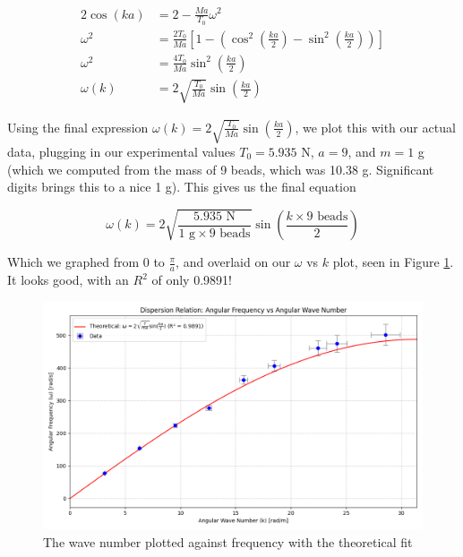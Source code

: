\documentclass[12pt,letterpaper]{article}
\begin{document}
\begin{align}
\label{eqn:dispersiontheo}
    2 \cos (ka) &= 2- \frac{Ma}{T_0}\omega^2 \\
    \omega^2 &= \frac{2T_0}{Ma}\left[1-\left(\cos^2 \left(\frac{ka}{2}\right)-\sin^2 \left(\frac{ka}{2}\right)\right)\right] \\
    \omega^2 &= \frac{4T_0}{Ma} \sin^2 \left(\frac{ka}{2}\right) \\
    \omega(k) &= 2\sqrt{\frac{T_0}{Ma}}\sin\left(\frac{ka}{2}\right)
\end{align}


Using the final expression $\omega(k) = 2\sqrt{\frac{T_0}{Ma}}\sin\left(\frac{ka}{2}\right)$, we plot this with our actual data, plugging in our experimental values $T_0 = 5.935$ N, $a = 9$, and $m = 1$ g (which we computed from the mass of 9 beads, which was 10.38 g. Significant digits brings this to a nice 1 g). This gives us the final equation

\begin{equation}
\label{eqn:dispersion}
    \omega(k) = 2\sqrt{\frac{5.935 \text{ N}}{1 \text { g}\times 9 \text{ beads}}}\sin\left(\frac{k\times 9 \text{ beads}}{2}\right)
\end{equation}

Which we graphed from 0 to $\frac{\pi}{a}$, and overlaid on our $\omega$ vs $k$ plot, seen in Figure \ref{fig:frequency}. It looks good, with an $R^2$ of only 0.9891!

\begin{figure}[ht]
    \centering
    \includegraphics[width=7in]{images/dispersion_relation_filtered_with_errors.png}
    \caption{The wave number plotted against frequency with the theoretical fit}
    \label{fig:frequency}
\end{figure}
\end{document}
